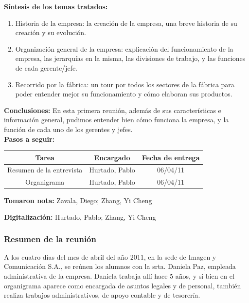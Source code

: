 \documentclass[a4paper,10pt,titlepage]{article}
\begin{document}
\vspace{4cm}
\textbf{S\'intesis de los temas tratados:}

\begin{enumerate}
	\item Historia de la empresa: la creaci\'on de la empresa, una breve historia de su creaci\'on y su evoluci\'on.

	\item Organizaci\'on general de la empresa: explicaci\'on del funcionamiento de la empresa, las jerarqu\'ias en la misma, las divisiones de trabajo, y las funciones de cada gerente/jefe.

	\item Recorrido por la f\'abrica: un tour por todos los sectores de la f\'abrica para poder entender mejor su funcionamiento y c\'omo elaboran sus productos.
\end{enumerate}


\textbf{Conclusiones:} En esta primera reuni\'on, adem\'as de sus caracter\'isticas e informaci\'on general, pudimos entender bien c\'omo funciona la empresa, y la funci\'on de cada uno de los gerentes y jefes.\\

\vspace{6cm}
\textbf{Pasos a seguir:}\\
\begin{center}
\begin{tabular}{|c|c|c|}
	\hline \textbf{Tarea} & \textbf{Encargado} & \textbf{Fecha de entrega} \\ 
	\hline Resumen de la entrevista & Hurtado, Pablo & 06/04/11 \\ 
	\hline Organigrama & Hurtado, Pablo & 06/04/11 \\ 
	\hline 
\end{tabular}
\end{center}



\textbf{Tomaron nota:} Zavala, Diego; Zhang, Yi Cheng

\textbf{Digitalizaci\'on:} Hurtado, Pablo; Zhang, Yi Cheng



\newpage

\subsubsection*{Resumen de la reuni\'on}
A los cuatro d\'ias del mes de abril del a\~no 2011, en la sede de Imagen y Comunicaci\'on S.A., se re\'unen los alumnos con la srta. Daniela Paz, empleada administrativa de la empresa.
Daniela trabaja all\'i hace 5 a\~nos, y si bien en el organigrama aparece como encargada de asuntos legales y de personal, tambi\'en realiza trabajos administrativos, de apoyo contable y de tesorer\'ia.
\end{document}
